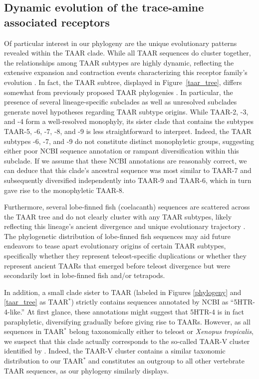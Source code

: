 \documentclass[fleqn,10pt]{wlpeerj}
\begin{document}
\subsection*{Dynamic evolution of the trace-amine associated receptors}
Of particular interest in our phylogeny are the unique evolutionary patterns revealed within the TAAR clade. While all TAAR sequences do cluster together, the relationships among TAAR subtypes are highly dynamic, reflecting the extensive expansion and contraction events characterizing this receptor family's evolution \citep{Lindemann2005,Hashiguchi2007,Staubert2010,Staubert2013}. In fact, the TAAR subtree, displayed in Figure~\ref{taar_tree}, differs somewhat from previously proposed TAAR phylogenies \citep{Lindemann2005, Hashiguchi2007}. In particular, the presence of several lineage-specific subclades as well as unresolved subclades generate novel hypotheses regarding TAAR subtype origins. While TAAR-2, -3, and -4 form a well-resolved monophyly, its sister clade that contains the subtypes TAAR-5, -6, -7, -8, and -9 is less straightforward to interpret. Indeed, the TAAR subtypes -6, -7, and -9 do not constitute distinct monophyletic groups, suggesting either poor NCBI sequence annotation or rampant diversification within this subclade. If we assume that these NCBI annotations are reasonably correct, we can deduce that this clade's ancestral sequence was most similar to TAAR-7 and subsequently diversified independently into TAAR-9 and TAAR-6, which in turn gave rise to the monophyletic TAAR-8. 

Furthermore, several lobe-finned fish (coelacanth) sequences are scattered across the TAAR tree and do not clearly cluster with any TAAR subtypes, likely reflecting this lineage's ancient divergence and unique evolutionary trajectory \citep{coelacanth2013}. The phylogenetic distribution of lobe-finned fish sequences may aid future endeavors to tease apart evolutionary origins of certain TAAR subtypes, specifically whether they represent teleost-specific duplications \citep{Gloriametal2005} or whether they represent ancient TAARs that emerged before teleost divergence but were secondarily lost in lobe-finned fish and/or tetrapods.

In addition, a small clade sister to TAAR (labeled in Figures \ref{phylogeny} and \ref{taar_tree} as TAAR$^\ast$) strictly contains sequences annotated by NCBI as ``5HTR-4-like.'' At first glance, these annotations might suggest that 5HTR-4 is in fact paraphyletic, diversifying gradually before giving rise to TAARs. However, as all sequences in TAAR$^\ast$ belong taxonomically either to teleost or \emph{Xenopus tropicalis}, we suspect that this clade actually corresponds to the so-called TAAR-V cluster identified by \cite{Hashiguchi2007}. Indeed, the TAAR-V cluster contains a similar taxonomic distribution to our TAAR$^\ast$ and constitutes an outgroup to all other vertebrate TAAR sequences, as our phylogeny similarly displays.
\end{document}
